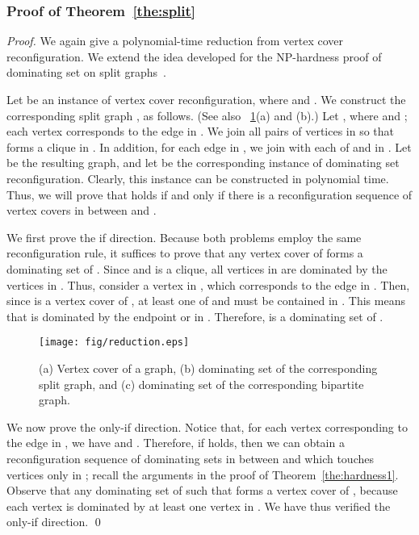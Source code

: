 \documentclass{llncs}
\begin{document}
\subsubsection{Proof of Theorem~\ref{the:split}}
\begin{proof}
We again give a polynomial-time reduction from {\sc vertex cover reconfiguration}.
We extend the idea developed for the NP-hardness proof of {\sc dominating set} on split graphs~\cite{Ber84}.
	
Let  be an instance of {\sc vertex cover reconfiguration}, where
 and .
We construct the corresponding split graph , as follows.
(See also \figurename~\ref{fig:reduction}(a) and (b).)
Let , where  and ;
each vertex  corresponds to the edge  in .
We join all pairs of vertices in  so that  forms a clique in .
In addition, for each edge  in , we join  with each of  and  in .
Let  be the resulting graph, and let  be the
corresponding instance of {\sc dominating set reconfiguration}.
Clearly, this instance can be constructed in polynomial time.
Thus, we will prove that  holds if and only if there is a
reconfiguration sequence of vertex covers in  between  and .

We first prove the if direction.
Because both problems employ the same reconfiguration rule, it suffices to prove
that any vertex cover  of  forms a dominating set of .
Since  and  is a clique, all vertices in  are dominated by the vertices in .
Thus, consider a vertex  in , which corresponds to the edge  in .
Then, since  is a vertex cover of , at least one of  and  must be contained in .
This means that  is dominated by the endpoint  or  in .
Therefore,  is a dominating set of .
	
\begin{figure}
    \centering
	\texttt{[image: fig/reduction.eps]}
	\vspace{-1em}
	\caption{(a) Vertex cover  of a graph, (b) dominating set
     of the corresponding split graph, and (c) dominating set  of the corresponding bipartite graph.}
	\vspace{-1em}
	\label{fig:reduction}
\end{figure}

We now prove the only-if direction.
Notice that, for each vertex  corresponding to
the edge  in , we have  and .
Therefore, if  holds, then we can obtain a reconfiguration
sequence of dominating sets in  between  and  which touches vertices only in ;
recall the arguments in the proof of Theorem~\ref{the:hardness1}.
Observe that any dominating set  of  such that 
forms a vertex cover of , because each vertex  is dominated by at least one vertex in .
We have thus verified the only-if direction.
\qed
\end{proof}
\end{document}
